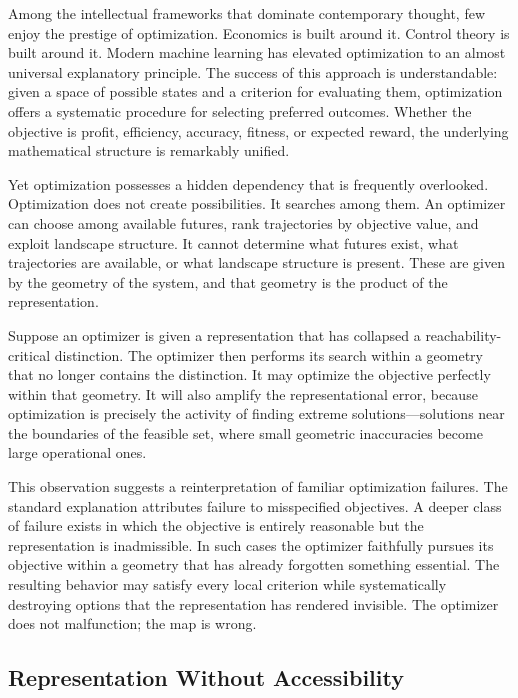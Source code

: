 \documentclass[12pt,a4paper]{article}
\theoremstyle{plain}
\theoremstyle{definition}
\theoremstyle{remark}
\begin{document}
Among the intellectual frameworks that dominate contemporary thought, few
enjoy the prestige of optimization. Economics is built around it. Control
theory is built around it. Modern machine learning has elevated optimization
to an almost universal explanatory principle. The success of this approach
is understandable: given a space of possible states and a criterion for
evaluating them, optimization offers a systematic procedure for selecting
preferred outcomes. Whether the objective is profit, efficiency, accuracy,
fitness, or expected reward, the underlying mathematical structure is
remarkably unified.

Yet optimization possesses a hidden dependency that is frequently overlooked.
Optimization does not create possibilities. It searches among them. An
optimizer can choose among available futures, rank trajectories by objective
value, and exploit landscape structure. It cannot determine what futures
exist, what trajectories are available, or what landscape structure is
present. These are given by the geometry of the system, and that geometry
is the product of the representation.

Suppose an optimizer is given a representation that has collapsed a
reachability-critical distinction. The optimizer then performs its search
within a geometry that no longer contains the distinction. It may optimize
the objective perfectly within that geometry. It will also amplify the
representational error, because optimization is precisely the activity of
finding extreme solutions---solutions near the boundaries of the feasible
set, where small geometric inaccuracies become large operational ones.

This observation suggests a reinterpretation of familiar optimization
failures. The standard explanation attributes failure to misspecified
objectives. A deeper class of failure exists in which the objective is
entirely reasonable but the representation is inadmissible. In such cases
the optimizer faithfully pursues its objective within a geometry that has
already forgotten something essential. The resulting behavior may satisfy
every local criterion while systematically destroying options that the
representation has rendered invisible. The optimizer does not malfunction;
the map is wrong.

\subsection{Representation Without Accessibility}
\end{document}

